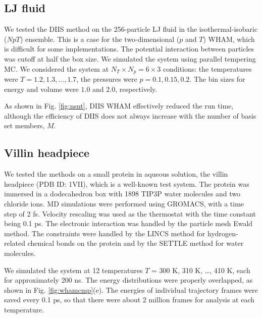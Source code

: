 \documentclass{gMOS2e}
\begin{document}
\subsection{\label{sec:results_LJ}
LJ fluid}


We tested the DIIS method
on the 256-particle LJ fluid in the isothermal-isobaric ($NpT$) ensemble.
%
This is a case for the two-dimensional ($p$ and $T$) WHAM,
which is difficult for some implementations.
%
The potential interaction between particles was cutoff at half the box size.
%
We simulated the system
using parallel tempering MC.
%
We considered the system
at $N_T \times N_p = 6\times 3$ conditions:
the temperatures were $T = 1.2, 1.3, \dots, 1.7$,
the pressures were $p = 0.1, 0.15, 0.2$.
%
The bin sizes for energy and volume
were $1.0$ and $2.0$, respectively.



As shown in Fig. \ref{fig:nsnt},
DIIS WHAM effectively
reduced the run time, although
the efficiency of DIIS does not
always increase with
the number of basis set members, $M$.




\subsection{\label{sec:results_villin}
Villin headpiece}



We tested the methods on a small protein in aqueous solution,
the villin headpiece
(PDB ID: 1VII), which is a well-known test system\cite{duan1998}.
%
The protein was immersed in
a dodecahedron box with 1898 TIP3P water molecules and two chloride ions.
%
MD simulations were performed
using GROMACS\cite{
berendsen1995, lindahl2001, vanderspoel2005, hess2008},
with a time step of 2 fs.
%
Velocity rescaling\cite{bussi2007}
was used as the thermostat with
the time constant being 0.1 ps.
%
The electronic interaction was
handled by the particle mesh Ewald method\cite{
essmann1995}.
%
The constraints were handled by the LINCS method\cite{
hess1997}
for hydrogen-related chemical bonds on the protein
and by the SETTLE method\cite{
miyamoto1992}
for water molecules.
%



We simulated the system at 12 temperatures
$T$ = 300 K, 310 K, \dots, 410 K,
each for approximately 200 ns.
%
The energy distributions were properly overlapped,
as shown in Fig. \ref{fig:whamcmp}(e).
%
The energies of individual trajectory frames were saved every 0.1 ps,
so that there were about 2 million frames for analysis
at each temperature.
\end{document}
